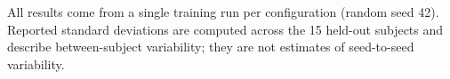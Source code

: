 All results come from a single training run per configuration (random seed 42). Reported standard deviations are computed across the 15 held-out subjects and describe between-subject variability; they are not estimates of seed-to-seed variability.
